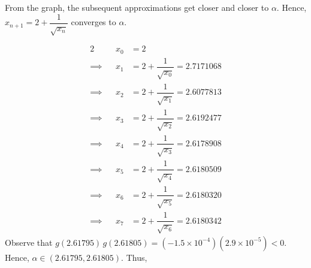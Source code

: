 \documentclass{jhwhw}
\begin{document}
\begin{center}
                \end{center}

                \noindent From the graph, the subsequent approximations get closer and closer to $\alpha$. Hence, $x_{n+1} = 2 + \dfrac1{\sqrt{x_n}}$ converges to $\alpha$.
                \medskip

            \subpart
                \begin{alignat*}{2}
                    &&x_0 &= 2\\
                    \implies&&x_1 &= 2 + \dfrac1{\sqrt{x_0}} = 2.7171068\\
                    \implies&&x_2 &= 2 + \dfrac1{\sqrt{x_1}} = 2.6077813\\
                    \implies&&x_3 &= 2 + \dfrac1{\sqrt{x_2}} = 2.6192477\\
                    \implies&&x_4 &= 2 + \dfrac1{\sqrt{x_3}} = 2.6178908\\
                    \implies&&x_5 &= 2 + \dfrac1{\sqrt{x_4}} = 2.6180509\\
                    \implies&&x_6 &= 2 + \dfrac1{\sqrt{x_5}} = 2.6180320\\
                    \implies&&x_7 &= 2 + \dfrac1{\sqrt{x_6}} = 2.6180342
                \end{alignat*}
                Observe that $g(2.61795)\,g(2.61805) = (-1.5 \times 10^{-4})(2.9 \times 10^{-5}) < 0$. Hence, $\alpha \in (2.61795, 2.61805)$. Thus,
\end{document}
